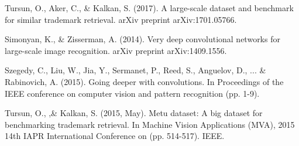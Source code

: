 \documentclass[conference]{IEEEtran}
\begin{document}
\begin{thebibliography}{00}

 Tursun, O., Aker, C., \& Kalkan, S. (2017). A large-scale dataset and benchmark for similar trademark retrieval. arXiv preprint arXiv:1701.05766.

 Simonyan, K., \& Zisserman, A. (2014). Very deep convolutional networks for large-scale image recognition. arXiv preprint arXiv:1409.1556.

 Szegedy, C., Liu, W., Jia, Y., Sermanet, P., Reed, S., Anguelov, D., ... \& Rabinovich, A. (2015). Going deeper with convolutions. In Proceedings of the IEEE conference on computer vision and pattern recognition (pp. 1-9).

 Tursun, O., ,\& Kalkan, S. (2015, May). Metu dataset: A big dataset for benchmarking trademark retrieval. In Machine Vision Applications (MVA), 2015 14th IAPR International Conference on (pp. 514-517). IEEE.

\end{thebibliography}
\end{document}
